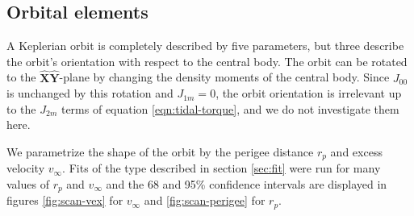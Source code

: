 \documentclass[fleqn,usenatbib]{mnras}
\newcommand{\unit}[1]{\bm{\hat{#1}}}
\begin{document}
\subsection{Orbital elements}
\label{sec:scan-orbit}
A Keplerian orbit is completely described by five parameters, but three describe the orbit's orientation with respect to the central body. The orbit can be rotated to the $\unit X \unit Y$-plane by changing the density moments of the central body. Since $J_{00}$ is unchanged by this rotation and $J_{1m}=0$, the orbit orientation is irrelevant up to the $J_{2m}$ terms of equation \ref{eqn:tidal-torque}, and we do not investigate them here.

We parametrize the shape of the orbit by the perigee distance $r_p$ and excess velocity $v_\infty$. Fits of the type described in section \ref{sec:fit} were run for many values of $r_p$ and $v_\infty$ and the 68 and 95\% confidence intervals are displayed in figures \ref{fig:scan-vex} for $v_\infty$ and \ref{fig:scan-perigee} for $r_p$.
\end{document}
